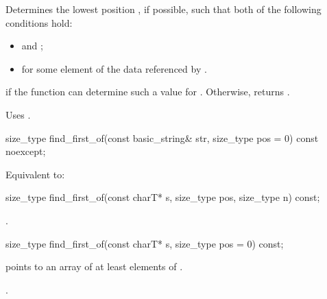 \begin{itemdescr}
\pnum
\effects
Determines the lowest position , if possible, such that both of
the following conditions hold:

\begin{itemize}
\item
{}
and
;
\item
{}%
for some element  of the data referenced by .
\end{itemize}

\pnum
\returns
{} if the function can determine such a value for .
Otherwise, returns
.

\pnum
\remarks
Uses
.
\end{itemdescr}

%
\begin{itemdecl}
size_type find_first_of(const basic_string& str, size_type pos = 0) const noexcept;
\end{itemdecl}

\begin{itemdescr}
\pnum
\effects
Equivalent to: 
\end{itemdescr}

%
\begin{itemdecl}
size_type find_first_of(const charT* s, size_type pos, size_type n) const;
\end{itemdecl}

\begin{itemdescr}
\pnum
\returns
{}.
\end{itemdescr}

%
\begin{itemdecl}
size_type find_first_of(const charT* s, size_type pos = 0) const;
\end{itemdecl}

\begin{itemdescr}
\pnum
\requires {} points to an array of at least 
elements of .

\pnum
\returns
{}.
\end{itemdescr}


